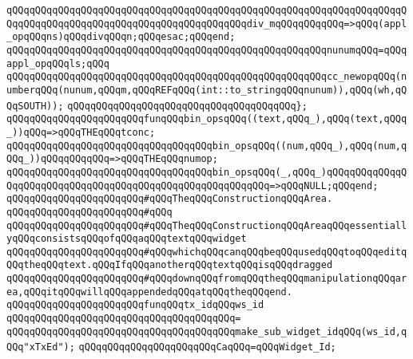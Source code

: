 \verb|qQQqqQQqqQQqqQQqqQQqqQQqqQQqqQQqqQQqqQQqqQQqqQQqqQQqqQQqqQQqqQQqqQQqqQQqqQQqqQQqqQQqqQQqqQQqqQQqqQQqqQQqqQQqqQQqdiv_mqQQqqQQqqQQq=>qQQq(appl_opqQQqns)qQQqdivqQQqn;qQQqesac;qQQqend;|\newline
\verb|qQQqqQQqqQQqqQQqqQQqqQQqqQQqqQQqqQQqqQQqqQQqqQQqqQQqqQQqnunumqQQq=qQQqappl_opqQQqls;qQQq|\newline
\newline
\verb|qQQqqQQqqQQqqQQqqQQqqQQqqQQqqQQqqQQqqQQqqQQqqQQqqQQqqQQqcc_newopqQQq(numberqQQq(nunum,qQQqm,qQQqREFqQQq(int::to_stringqQQqnunum)),qQQq(wh,qQQqSOUTH));|\newline
\verb|qQQqqQQqqQQqqQQqqQQqqQQqqQQqqQQqqQQqqQQq};|\newline
\newline
\newline
\verb|qQQqqQQqqQQqqQQqqQQqqQQqfunqQQqbin_opsqQQq((text,qQQq_),qQQq(text,qQQq_))qQQq=>qQQqTHEqQQqtconc;|\newline
\verb|qQQqqQQqqQQqqQQqqQQqqQQqqQQqqQQqqQQqbin_opsqQQq((num,qQQq_),qQQq(num,qQQq_))qQQqqQQqqQQq=>qQQqTHEqQQqnumop;|\newline
\verb|qQQqqQQqqQQqqQQqqQQqqQQqqQQqqQQqqQQqbin_opsqQQq(_,qQQq_)qQQqqQQqqQQqqQQqqQQqqQQqqQQqqQQqqQQqqQQqqQQqqQQqqQQqqQQqqQQq=>qQQqNULL;qQQqend;|\newline
\newline
\verb|qQQqqQQqqQQqqQQqqQQqqQQq#qQQqTheqQQqConstructionqQQqArea.|\newline
\verb|qQQqqQQqqQQqqQQqqQQqqQQq#qQQq|\newline
\verb|qQQqqQQqqQQqqQQqqQQqqQQq#qQQqTheqQQqConstructionqQQqAreaqQQqessentiallyqQQqconsistsqQQqofqQQqaqQQqtextqQQqwidget|\newline
\verb|qQQqqQQqqQQqqQQqqQQqqQQq#qQQqwhichqQQqcanqQQqbeqQQqusedqQQqtoqQQqeditqQQqtheqQQqtext.qQQqIfqQQqanotherqQQqtextqQQqisqQQqdragged|\newline
\verb|qQQqqQQqqQQqqQQqqQQqqQQq#qQQqdownqQQqfromqQQqtheqQQqmanipulationqQQqarea,qQQqitqQQqwillqQQqappendedqQQqatqQQqtheqQQqend.|\newline
\newline
\verb|qQQqqQQqqQQqqQQqqQQqqQQqfunqQQqtx_idqQQqws_id|\newline
\verb|qQQqqQQqqQQqqQQqqQQqqQQqqQQqqQQqqQQqqQQq=|\newline
\verb|qQQqqQQqqQQqqQQqqQQqqQQqqQQqqQQqqQQqqQQqmake_sub_widget_idqQQq(ws_id,qQQq"xTxEd");|\newline
\newline
\verb|qQQqqQQqqQQqqQQqqQQqqQQqCaqQQq=qQQqWidget_Id;|\newline
